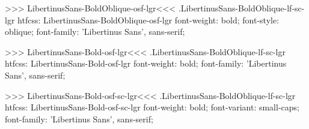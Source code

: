 >>>
\<LibertinusSans-BoldOblique-osf-lgr\><<<
.LibertinusSans-BoldOblique-lf-sc-lgr
htfcss:  LibertinusSans-BoldOblique-osf-lgr  font-weight: bold; font-style: oblique; font-family: 'Libertinus Sans', sans-serif;

>>>
\<LibertinusSans-Bold-osf-lgr\><<<
.LibertinusSans-BoldOblique-lf-sc-lgr
htfcss:  LibertinusSans-Bold-osf-lgr  font-weight: bold; font-family: 'Libertinus Sans', sans-serif;

>>>
\<LibertinusSans-Bold-osf-sc-lgr\><<<
.LibertinusSans-BoldOblique-lf-sc-lgr
htfcss:  LibertinusSans-Bold-osf-sc-lgr  font-weight: bold; font-variant: small-caps; font-family: 'Libertinus Sans', sans-serif;

